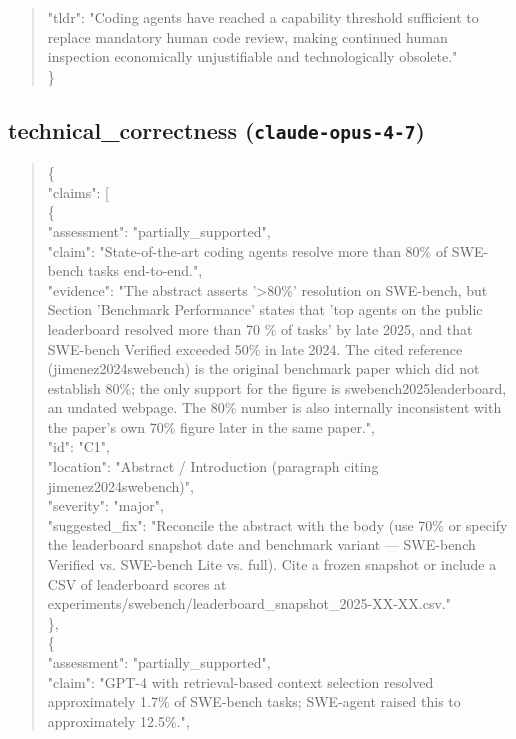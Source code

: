 \documentclass[11pt]{article}
\begin{document}
\begin{quote}
  "tldr": "Coding agents have reached a capability threshold sufficient to replace mandatory human code review, making continued human inspection economically unjustifiable and technologically obsolete."\\
\}\\
\end{quote}

\subsection*{technical\_correctness (\texttt{claude-opus-4-7})}
\begin{quote}\small\ttfamily\raggedright
\{\\
  "claims": [\\
    \{\\
      "assessment": "partially\_supported",\\
      "claim": "State-of-the-art coding agents resolve more than 80\% of SWE-bench tasks end-to-end.",\\
      "evidence": "The abstract asserts '>80\%' resolution on SWE-bench, but Section 'Benchmark Performance' states that 'top agents on the public leaderboard resolved more than 70 \% of tasks' by late 2025, and that SWE-bench Verified exceeded 50\% in late 2024. The cited reference (jimenez2024swebench) is the original benchmark paper which did not establish 80\%; the only support for the figure is swebench2025leaderboard, an undated webpage. The 80\% number is also internally inconsistent with the paper's own 70\% figure later in the same paper.",\\
      "id": "C1",\\
      "location": "Abstract / Introduction (paragraph citing jimenez2024swebench)",\\
      "severity": "major",\\
      "suggested\_fix": "Reconcile the abstract with the body (use 70\% or specify the leaderboard snapshot date and benchmark variant --- SWE-bench Verified vs. SWE-bench Lite vs. full). Cite a frozen snapshot or include a CSV of leaderboard scores at experiments/swebench/leaderboard\_snapshot\_2025-XX-XX.csv."\\
    \},\\
    \{\\
      "assessment": "partially\_supported",\\
      "claim": "GPT-4 with retrieval-based context selection resolved approximately 1.7\% of SWE-bench tasks; SWE-agent raised this to approximately 12.5\%.",\\

\end{quote}
\end{document}
